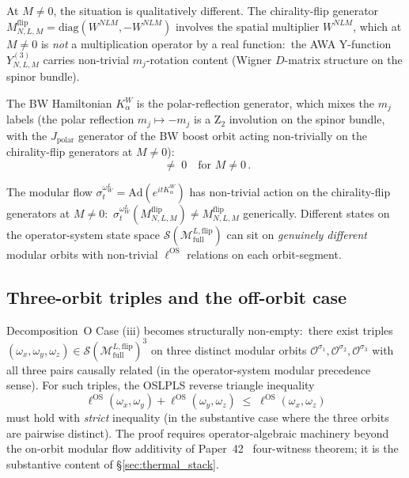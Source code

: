 \documentclass[11pt,a4paper]{article}
\theoremstyle{plain}
\theoremstyle{definition}
\newcommand{\Scal}{\mathcal{S}}
\newcommand{\Mcal}{\mathcal{M}}
\newcommand{\Ocal}{\mathcal{O}}
\newcommand{\BWvac}{\omega_{W}^{L}}
\newcommand{\Kalpha}{K_{\alpha}^{W}}
\newcommand{\ellOS}{\ell^{\mathrm{OS}}}
\newcommand{\Mflipfull}{\Mcal^{L,\mathrm{flip}}_{\mathrm{full}}}
\newcommand{\Mflip}[3]{M^{\mathrm{flip}}_{#1,#2,#3}}
\newcommand{\Wspat}[3]{W^{#1#2#3}}
\newcommand{\Oorb}[1]{\Ocal^{\sigma_{#1}}}
\begin{document}
At $M\ne 0$, the situation is qualitatively different. The chirality-flip
generator $\Mflip{N}{L}{M}=\mathrm{diag}(\Wspat{N}{L}{M},-\Wspat{N}{L}{M})$
involves the spatial multiplier $\Wspat{N}{L}{M}$, which at $M\ne 0$ is
\emph{not} a multiplication operator by a real function:\ the AWA
Y-function $Y^{(3)}_{N,L,M}$ carries non-trivial $m_{j}$-rotation
content (Wigner $D$-matrix structure on the spinor bundle).

The BW Hamiltonian $\Kalpha$ is the polar-reflection generator, which
mixes the $m_{j}$ labels (the polar reflection $m_{j}\mapsto-m_{j}$
is a Z$_{2}$ involution on the spinor bundle, with the $J_{\mathrm{polar}}$
generator of the BW boost orbit acting non-trivially on the
chirality-flip generators at $M\ne 0$):
\begin{equation}
  [\Kalpha,\Mflip{N}{L}{M}] \;\ne\; 0\quad\text{for }M\ne 0\,.
  \label{eq:M_neq_0_noncommute}
\end{equation}

The modular flow $\sigma_{t}^{\BWvac}=\mathrm{Ad}(e^{it\Kalpha})$ has
non-trivial action on the chirality-flip generators at $M\ne 0$:\
$\sigma_{t}^{\BWvac}(\Mflip{N}{L}{M})\ne\Mflip{N}{L}{M}$ generically.
Different states on the operator-system state space $\Scal(\Mflipfull)$
can sit on \emph{genuinely different} modular orbits with non-trivial
$\ellOS$ relations on each orbit-segment.

\subsection{Three-orbit triples and the off-orbit case}
\label{sec:three_orbit_triples}

Decomposition~O Case (iii) becomes structurally non-empty:\ there
exist triples $(\omega_{x},\omega_{y},\omega_{z})\in
\Scal(\Mflipfull)^{3}$ on three distinct modular orbits
$\Oorb{1},\Oorb{2},\Oorb{3}$ with all three pairs causally related
(in the operator-system modular precedence sense). For such triples,
the OSLPLS reverse triangle inequality
\begin{equation}
  \ellOS(\omega_{x},\omega_{y})+\ellOS(\omega_{y},\omega_{z}) \;\le\; \ellOS(\omega_{x},\omega_{z})
  \label{eq:oslpls_reverse_triangle}
\end{equation}
must hold with \emph{strict} inequality (in the substantive case
where the three orbits are pairwise distinct). The proof requires
operator-algebraic machinery beyond the on-orbit modular flow
additivity of Paper~42~\cite{paper42} four-witness theorem; it is
the substantive content of \S\ref{sec:thermal_stack}.
\end{document}
